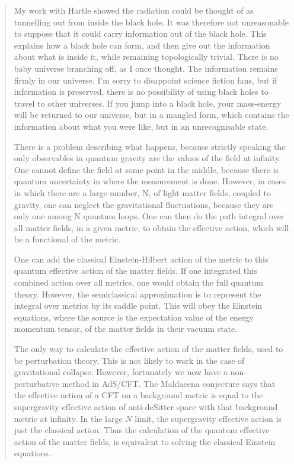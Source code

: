 \documentclass{article}
\begin{document}
\begin{quote}
My work with Hartle showed the radiation could be thought of as
tunnelling out from inside the black hole. It was therefore not
unreasonable to suppose that it could carry information out of the black
hole. This explains how a black hole can form, and then give out the
information about what is inside it, while remaining topologically
trivial. There is no baby universe branching off, as I once thought. The
information remains firmly in our universe. I'm sorry to disappoint
science fiction fans, but if information is preserved, there is no
possibility of using black holes to travel to other universes. If you
jump into a black hole, your mass-energy will be returned to our
universe, but in a mangled form, which contains the information about
what you were like, but in an unrecognisable state.

There is a problem describing what happens, because strictly speaking
the only observables in quantum gravity are the values of the field at
infinity. One cannot define the field at some point in the middle,
because there is quantum uncertainty in where the measurement is done.
However, in cases in which there are a large number, N, of light matter
fields, coupled to gravity, one can neglect the gravitational
fluctuations, because they are only one among N quantum loops. One can
then do the path integral over all matter fields, in a given metric, to
obtain the effective action, which will be a functional of the metric.

One can add the classical Einstein-Hilbert action of the metric to this
quantum effective action of the matter fields. If one integrated this
combined action over all metrics, one would obtain the full quantum
theory. However, the semiclassical approximation is to represent the
integral over metrics by its saddle point. This will obey the Einstein
equations, where the source is the expectation value of the energy
momentum tensor, of the matter fields in their vacuum state.

The only way to calculate the effective action of the matter fields,
used to be perturbation theory. This is not likely to work in the case
of gravitational collapse. However, fortunately we now have a
non-perturbative method in AdS/CFT. The Maldacena conjecture says that
the effective action of a CFT on a background metric is equal to the
supergravity effective action of anti-deSitter space with that
background metric at infinity. In the large \(N\) limit, the
supergravity effective action is just the classical action. Thus the
calculation of the quantum effective action of the matter fields, is
equivalent to solving the classical Einstein equations.


\end{quote}
\end{document}
